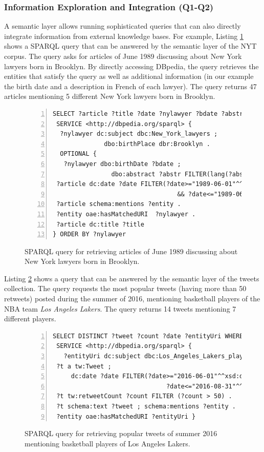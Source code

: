 \documentclass[twocolumn]{svjour3}
\begin{document}
\subsubsection*{Information Exploration and Integration (Q1-Q2)}
A semantic layer allows running sophisticated que\-ries
that can also directly integrate information from external knowledge bases.
For example, Listing \ref{fig:queryExampleIntegrate} shows a SPARQL query
that can be answered by the semantic layer of the NYT corpus.
The query asks for articles of June 1989
discussing about New York lawyers born in Brooklyn.
By directly accessing DBpedia, the query retrieves the
entities that satisfy the query
as well as additional information (in our example the birth date
and a description in French of each lawyer).
The query returns  47 articles mentioning 5 different
New York lawyers born in Brooklyn.

\begin{figure}[th]
\centering \scriptsize
\begin{Verbatim}[frame=lines,numbers=left,numbersep=1pt]
SELECT ?article ?title ?date ?nylawyer ?bdate ?abstr WHERE {
 SERVICE <http://dbpedia.org/sparql> {
  ?nylawyer dc:subject dbc:New_York_lawyers ;
              dbo:birthPlace dbr:Brooklyn .
  OPTIONAL {
   ?nylawyer dbo:birthDate ?bdate ;
                dbo:abstract ?abstr FILTER(lang(?abstr)="fr")}}
 ?article dc:date ?date FILTER(?date>="1989-06-01"^^xsd:date
                                  && ?date<="1989-06-30"^^xsd:date)
 ?article schema:mentions ?entity .
 ?entity oae:hasMatchedURI  ?nylawyer .
 ?article dc:title ?title
} ORDER BY ?nylawyer
\end{Verbatim}
\vspace{-4mm}
\caption{SPARQL query for retrieving articles of June 1989
discussing about New York lawyers born in Brooklyn.}
\label{fig:queryExampleIntegrate}
\end{figure}

Listing \ref{fig:queryExampleTweet} shows a query that can be answered
by the semantic layer of the tweets collection.
The query requests the most popular tweets (having more than 50 retweets)
posted during the summer of 2016, mentioning
basketball players of the NBA team {\em Los Angeles Lakers}.
The query returns 14 tweets mentioning 7 different players.

\begin{figure}[th]
\centering \scriptsize
\begin{Verbatim}[frame=lines,numbers=left,numbersep=1pt]
SELECT DISTINCT ?tweet ?count ?date ?entityUri WHERE {
 SERVICE <http://dbpedia.org/sparql> {
   ?entityUri dc:subject dbc:Los_Angeles_Lakers_players }
 ?t a tw:Tweet ;
     dc:date ?date FILTER(?date>="2016-06-01"^^xsd:dateTime &&
                               ?date<="2016-08-31"^^xsd:dateTime)
 ?t tw:retweetCount ?count FILTER (?count > 50) .
 ?t schema:text ?tweet ; schema:mentions ?entity .
 ?entity oae:hasMatchedURI ?entityUri }
 \end{Verbatim}
\vspace{-4mm}
\caption{SPARQL query for retrieving popular tweets of summer 2016
mentioning basketball players of Los Angeles Lakers.}
\label{fig:queryExampleTweet}
\end{figure}
\end{document}
